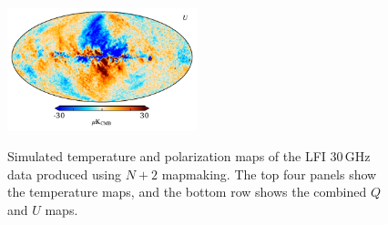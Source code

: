\documentclass{aa}
\begin{document}
\begin{figure}
  \includegraphics[width=0.49\textwidth]{figs/sim_U.pdf}\\
  \caption{Simulated temperature and polarization maps of the LFI 30\,GHz data produced using $N+2$ mapmaking. The top four panels show the temperature maps, and the bottom row shows the combined $Q$ and $U$ maps.}
  \label{fig:sim}
\end{figure}
\end{document}
